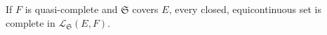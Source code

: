 If \(F\) is quasi-complete and \(\mathfrak{S}\) covers \(E\), every closed, equicontinuous set is complete in \(\mathcal{L}_\mathfrak{S}(E, F)\).